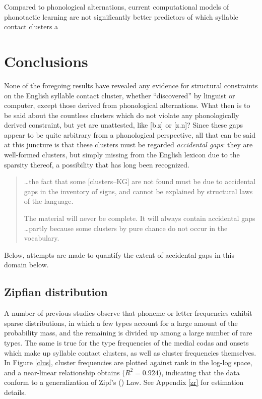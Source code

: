 Compared to phonological alternations, current computational models of phonotactic learning are not significantly better predictors of which syllable contact clusters a

\section{Conclusions}

None of the foregoing results have revealed any evidence for structural constraints on the English syllable contact cluster, whether ``discovered'' by linguist or computer, except those derived from phonological alternations. What then is to be said about the countless clusters which do not violate any phonologically derived constraint, but yet are unattested, like [b.z] or [z.n]? Since these gaps appear to be quite arbitrary from a phonological perspective, all that can be said at this juncture is that these clusters must be regarded \emph{accidental gaps}: they are well-formed clusters, but simply missing from the English lexicon due to the sparsity thereof, a possibility that has long been recognized.

\begin{quote}
\ldots{}the fact that some [clusters--KG] are not found must be due to accidental gaps in the inventory of signs, and cannot be explained by structural laws of the language. \citep[][16]{Fischer-Jorgensen1952}

The material will never be complete. It will always contain accidental gaps \ldots partly because some clusters by pure chance do not occur in the vocabulary. \citep[][30]{Vogt1954}
\end{quote}

\noindent Below, attempts are made to quantify the extent of accidental gaps in this domain below.

\subsection{Zipfian distribution}

A number of previous studies \citep[e.g.,][]{Weiss1961,Sigurd1968,Good1969,Borodovsky1989,Witten1990,Martindale1996,Tambovtsev2007} observe that phoneme or letter frequencies exhibit sparse distributions, in which a few types account for a large amount of the probability mass, and the remaining is divided up among a large number of rare types. The same is true for the type frequencies of the medial codas and onsets which make up syllable contact clusters, as well as cluster frequencies themselves. In Figure \ref{clus}, cluster frequencies are plotted against rank in the log-log space, and a near-linear relationship obtains ($R^2 = 0.924$), indicating that the data conform to a generalization of Zipf's (\citeyear{Zipf1949}) Law. See Appendix \ref{zr} for estimation details.

